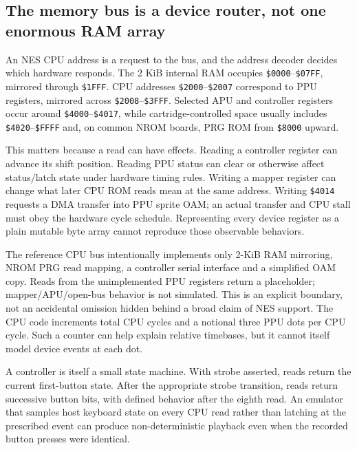 \subsection{The memory bus is a device router, not one enormous RAM array}\label{the-memory-bus-is-a-device-router-not-one-enormous-ram-array}

An NES CPU address is a request to the bus, and the address decoder decides which hardware responds. The 2 KiB internal RAM occupies \texttt{\$0000}--\texttt{\$07FF}, mirrored through \texttt{\$1FFF}. CPU addresses \texttt{\$2000}--\texttt{\$2007} correspond to PPU registers, mirrored across \texttt{\$2008}--\texttt{\$3FFF}. Selected APU and controller registers occur around \texttt{\$4000}--\texttt{\$4017}, while cartridge-controlled space usually includes \texttt{\$4020}--\texttt{\$FFFF} and, on common NROM boards, PRG ROM from \texttt{\$8000} upward.

This matters because a read can have effects. Reading a controller register can advance its shift position. Reading PPU status can clear or otherwise affect status/latch state under hardware timing rules. Writing a mapper register can change what later CPU ROM reads mean at the same address. Writing \texttt{\$4014} requests a DMA transfer into PPU sprite OAM; an actual transfer and CPU stall must obey the hardware cycle schedule. Representing every device register as a plain mutable byte array cannot reproduce those observable behaviors.

The reference CPU bus intentionally implements only 2-KiB RAM mirroring, NROM PRG read mapping, a controller serial interface and a simplified OAM copy. Reads from the unimplemented PPU registers return a placeholder; mapper/APU/open-bus behavior is not simulated. This is an explicit boundary, not an accidental omission hidden behind a broad claim of NES support. The CPU code increments total CPU cycles and a notional three PPU dots per CPU cycle. Such a counter can help explain relative timebases, but it cannot itself model device events at each dot.

A controller is itself a small state machine. With strobe asserted, reads return the current first-button state. After the appropriate strobe transition, reads return successive button bits, with defined behavior after the eighth read. An emulator that samples host keyboard state on every CPU read rather than latching at the prescribed event can produce non-deterministic playback even when the recorded button presses were identical.

